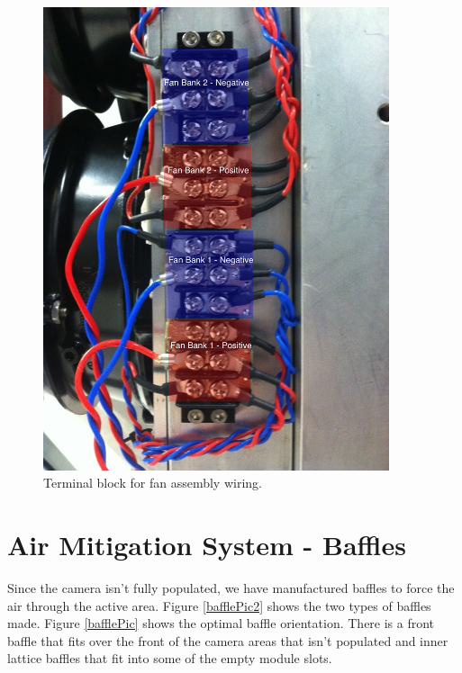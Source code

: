 \documentclass[11pt]{article}
\begin{document}
\begin{figure}[!th]
\begin{center}
\includegraphics[width = 4in]{fanWiring.jpg}
\caption{Terminal block for fan assembly wiring.}  
\label{fanPic}
\end{center}
\end{figure}

\newpage
\section{Air Mitigation System - Baffles}

Since the camera isn't fully populated, we have manufactured baffles to force the air through the active area. 
Figure \ref{bafflePic2} shows the two types of baffles made.
Figure \ref{bafflePic} shows the optimal baffle orientation.
There is a front baffle that fits over the front of the camera areas that isn't populated and inner lattice baffles that fit into some of the empty module slots.
\end{document}
